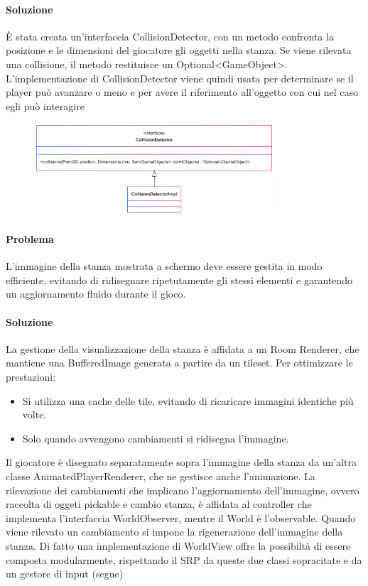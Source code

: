 \documentclass[a4paper,12pt]{report}
\begin{document}
\paragraph{Soluzione} %
È stata creata un'interfaccia CollisionDetector, con un metodo confronta la posizione e le dimensioni del giocatore gli oggetti nella stanza. Se viene rilevata una collisione, il metodo restituisce un Optional<GameObject>.
L'implementazione di CollisionDetector viene quindi usata per determinare se il player può avanzare o meno e per avere il riferimento all'oggetto con cui nel caso egli può interagire
\begin{figure}[h]
    \centering
    \includegraphics[width=0.8\textwidth]{img/CD.png}
    \label{img:ObjectExtractor}
\end{figure}

\paragraph{Problema} %
L’immagine della stanza mostrata a schermo deve essere gestita in modo efficiente, evitando di ridisegnare ripetutamente gli stessi elementi e garantendo un aggiornamento fluido durante il gioco.
\paragraph{Soluzione} %
La gestione della visualizzazione della stanza è affidata a un Room Renderer, che mantiene una BufferedImage generata a partire da un tileset. Per ottimizzare le prestazioni:
\begin{itemize}
    \item Si utilizza una cache delle tile, evitando di ricaricare immagini identiche più volte.
    \item Solo quando avvengono cambiamenti si ridisegna l’immagine.
\end{itemize}
Il giocatore è disegnato separatamente sopra l’immagine della stanza da un’altra classe AnimatedPlayerRenderer, che ne gestisce anche l’animazione. 
La rilevazione dei cambiamenti che implicano l’aggiornamento dell’immagine, ovvero raccolta di oggeti pickable e cambio stanza, è affidata al controller che implementa l’interfaccia WorldObserver, mentre il World è l'observable.
Quando viene rilevato un cambiamento si impone la rigenerazione dell'immagine della stanza.
Di fatto una implementazione di WorldView offre la possibiltà di essere composta modularmente, rispettando il SRP da queste due classi sopracitate e da un gestore di input (segue)
\end{document}
